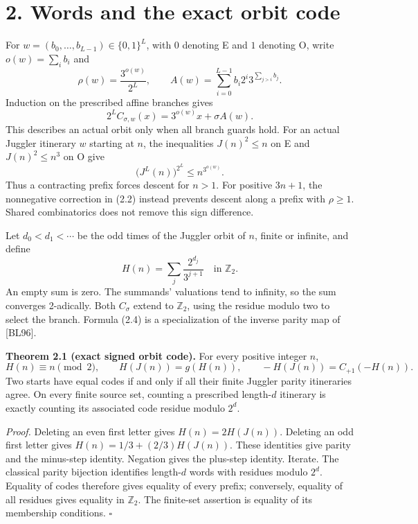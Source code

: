 \documentclass[11pt,a4paper]{article}
\begin{document}
\section{2. Words and the exact orbit
code}\label{words-and-the-exact-orbit-code}

For \(w=(b_0,\ldots,b_{L-1})\in\{0,1\}^L\), with \(0\) denoting E and
\(1\) denoting O, write \(o(w)=\sum_i b_i\) and \[
\rho(w)=\frac{3^{o(w)}}{2^L},\qquad
A(w)=\sum_{i=0}^{L-1}b_i2^i3^{\sum_{j>i}b_j}.
\tag{2.1}
\] Induction on the prescribed affine branches gives \[
2^L C_{\sigma,w}(x)=3^{o(w)}x+\sigma A(w).
\tag{2.2}
\] This describes an actual orbit only when all branch guards hold. For
an actual Juggler itinerary \(w\) starting at \(n\), the inequalities
\(J(n)^2\le n\) on E and \(J(n)^2\le n^3\) on O give \[
\bigl(J^L(n)\bigr)^{2^L}\le n^{3^{o(w)}}.
\tag{2.3}
\] Thus a contracting prefix forces descent for \(n>1\). For positive
\(3n+1\), the nonnegative correction in (2.2) instead prevents descent
along a prefix with \(\rho\ge1\). Shared combinatorics does not remove
this sign difference.

Let \(d_0<d_1<\cdots\) be the odd times of the Juggler orbit of \(n\),
finite or infinite, and define \[
H(n)=\sum_j\frac{2^{d_j}}{3^{j+1}}\quad\text{in }\mathbb Z_2.
\tag{2.4}
\] An empty sum is zero. The summands' valuations tend to infinity, so
the sum converges 2-adically. Both \(C_\sigma\) extend to
\(\mathbb Z_2\), using the residue modulo two to select the branch.
Formula (2.4) is a specialization of the inverse parity map of
{[}BL96{]}.

\textbf{Theorem 2.1 (exact signed orbit code).} For every positive
integer \(n\), \[
H(n)\equiv n\pmod2,\qquad
H(J(n))=g(H(n)),\qquad
-H(J(n))=C_{+1}(-H(n)).
\tag{2.5}
\] Two starts have equal codes if and only if all their finite Juggler
parity itineraries agree. On every finite source set, counting a
prescribed length-\(d\) itinerary is exactly counting its associated
code residue modulo \(2^d\).

\emph{Proof.} Deleting an even first letter gives \(H(n)=2H(J(n))\).
Deleting an odd first letter gives \(H(n)=1/3+(2/3)H(J(n))\). These
identities give parity and the minus-step identity. Negation gives the
plus-step identity. Iterate. The classical parity bijection identifies
length-\(d\) words with residues modulo \(2^d\). Equality of codes
therefore gives equality of every prefix; conversely, equality of all
residues gives equality in \(\mathbb Z_2\). The finite-set assertion is
equality of its membership conditions. \(\square\)
\end{document}
